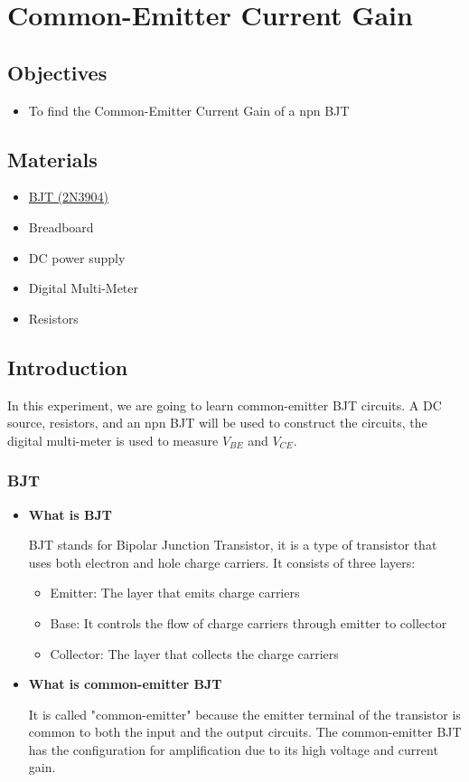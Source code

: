 \chapter{Common-Emitter Current Gain}


\section{Objectives}
\begin{itemize}
    \item To find the Common-Emitter Current Gain of a npn BJT
\end{itemize}

\section{Materials}
\begin{itemize}
    \item \hyperref[2N3904_1]{BJT (2N3904)}
    \item Breadboard
    \item DC power supply
    \item Digital Multi-Meter
    \item Resistors
\end{itemize}

\section{Introduction}
In this experiment, we are going to learn common-emitter BJT circuits. A DC source, resistors, and an npn BJT will be used to construct the circuits, the digital multi-meter is used to measure $V_{BE}$ and $V_{CE}$.\par
    \subsection{BJT}
    \begin{itemize}
        \item \textbf{What is BJT}\par
            BJT stands for Bipolar Junction Transistor, it is a type of transistor that uses both electron and hole charge carriers. It consists of three layers:\par
            \begin{itemize}
                \item Emitter: The layer that emits charge carriers
                \item Base: It controls the flow of charge carriers through emitter to collector
                \item Collector: The layer that collects the charge carriers
            \end{itemize}
        \item \textbf{What is common-emitter BJT}\par
            It is called "common-emitter" because the emitter terminal of the transistor is common to both the input and the output circuits. The common-emitter BJT has the configuration for amplification due to its high voltage and current gain.
    \end{itemize}
